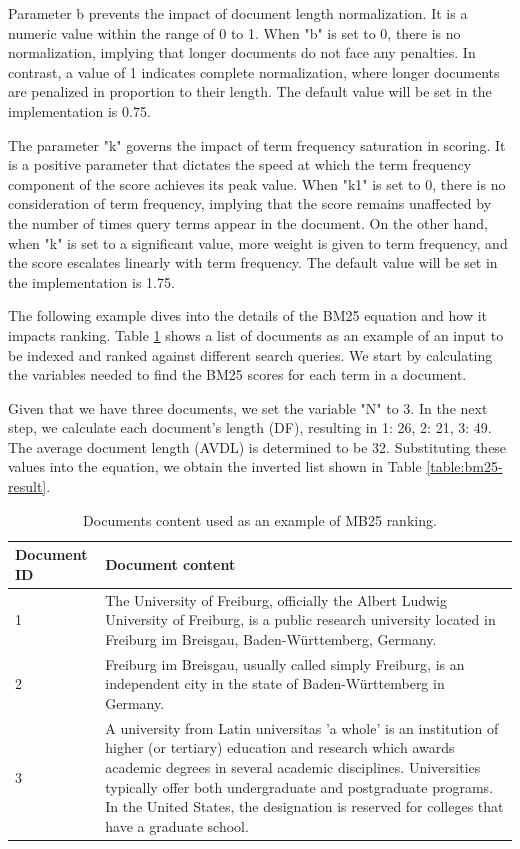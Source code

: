 Parameter b prevents the impact of document length normalization. It is a numeric value within the range of 0 to 1. When "b" is set to 0, there is no normalization, implying that longer documents do not face any penalties. In contrast, a value of 1 indicates complete normalization, where longer documents are penalized in proportion to their length. The default value will be set in the implementation is 0.75.

The parameter "k" governs the impact of term frequency saturation in scoring. It is a positive parameter that dictates the speed at which the term frequency component of the score achieves its peak value. When "k1" is set to 0, there is no consideration of term frequency, implying that the score remains unaffected by the number of times query terms appear in the document. On the other hand, when "k" is set to a significant value, more weight is given to term frequency, and the score escalates linearly with term frequency. The default value will be set in the implementation is 1.75.

The following example dives into the details of the BM25 equation and how it impacts ranking. Table \ref{table:bm25-documents} shows a list of documents as an example of an input to be indexed and ranked against different search queries. We start by calculating the variables needed to find the BM25 scores for each term in a document.    

Given that we have three documents, we set the variable "N" to 3. In the next step, we calculate each document's length (DF), resulting in {1: 26, 2: 21, 3: 49}. The average document length (AVDL) is determined to be 32. Substituting these values into the equation, we obtain the inverted list shown in Table \ref{table:bm25-result}.

\begin{table}[ht] 
{\footnotesize
\begin{tabular}{ |p{2.5cm}||p{10.3cm}|  }
\hline \hline
Document ID & Document content\T\B 
\\ 
\hline
1 & The University of Freiburg, officially the Albert Ludwig University of Freiburg, is a public research university located in Freiburg im Breisgau, Baden-Württemberg, Germany.\T\B 
\\ 
\hline
2 & Freiburg im Breisgau, usually called simply Freiburg, is an independent city in the state of Baden-Württemberg in Germany.\T\B 
\\ 
\hline
3 & A university from Latin universitas 'a whole' is an institution of higher (or tertiary) education and research which awards academic degrees in several academic disciplines. Universities typically offer both undergraduate and postgraduate programs. In the United States, the designation is reserved for colleges that have a graduate school.\T\B 
\\ 
\hline \hline
    \end{tabular}
}
  \captionsetup{justification=centering,margin=2cm}
  \caption{Documents content used as an example of MB25 ranking.}
  \label{table:bm25-documents}
\end{table}

